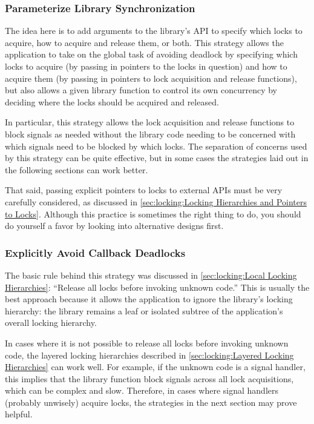 \subsubsection{Parameterize Library Synchronization}
\label{sec:locking:Parameterize Library Synchronization}

The idea here is to add arguments to the library's API to specify
which locks to acquire, how to acquire and release them, or both.
This strategy allows the application to take on the global task of
avoiding deadlock by specifying which locks to acquire (by passing in
pointers to the locks in question) and how to
acquire them (by passing in pointers to lock acquisition and release
functions),
but also allows a given library function to control its own concurrency
by deciding where the locks should be acquired and released.

In particular, this strategy allows the lock acquisition and release
functions to block signals as needed without the library code needing to
be concerned with which signals need to be blocked by which locks.
The separation of concerns used by this strategy can be quite effective,
but in some cases the strategies laid out in the following sections
can work better.

That said, passing explicit pointers to locks to external APIs must
be very carefully considered, as discussed in
\cref{sec:locking:Locking Hierarchies and Pointers to Locks}.
Although this practice is sometimes the right thing to do, you should do
yourself a favor by looking into alternative designs first.

\subsubsection{Explicitly Avoid Callback Deadlocks}
\label{sec:locking:Explicitly Avoid Callback Deadlocks}

The basic rule behind this strategy was discussed in
\cref{sec:locking:Local Locking Hierarchies}: ``Release all
locks before invoking unknown code.''
This is usually the best approach because it allows the application to
ignore the library's locking hierarchy: the library remains a leaf or
isolated subtree of the application's overall locking hierarchy.

In cases where it is not possible to release all locks before invoking
unknown code, the layered locking hierarchies described in
\cref{sec:locking:Layered Locking Hierarchies} can work well.
For example, if the unknown code is a signal handler, this implies that
the library function block signals across all lock acquisitions, which
can be complex and slow.
Therefore, in cases where signal handlers (probably unwisely) acquire
locks, the strategies in the next section may prove helpful.

